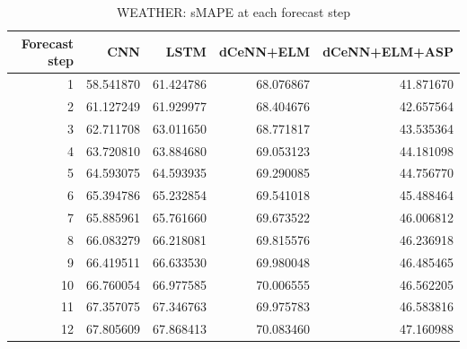 \begin{table}
\caption{WEATHER: sMAPE at each forecast step}
\begin{tabular}{rrrrr}
\toprule
Forecast step & CNN & LSTM & dCeNN+ELM & dCeNN+ELM+ASP \\
\midrule
1 & 58.541870 & 61.424786 & 68.076867 & 41.871670 \\
2 & 61.127249 & 61.929977 & 68.404676 & 42.657564 \\
3 & 62.711708 & 63.011650 & 68.771817 & 43.535364 \\
4 & 63.720810 & 63.884680 & 69.053123 & 44.181098 \\
5 & 64.593075 & 64.593935 & 69.290085 & 44.756770 \\
6 & 65.394786 & 65.232854 & 69.541018 & 45.488464 \\
7 & 65.885961 & 65.761660 & 69.673522 & 46.006812 \\
8 & 66.083279 & 66.218081 & 69.815576 & 46.236918 \\
9 & 66.419511 & 66.633530 & 69.980048 & 46.485465 \\
10 & 66.760054 & 66.977585 & 70.006555 & 46.562205 \\
11 & 67.357075 & 67.346763 & 69.975783 & 46.583816 \\
12 & 67.805609 & 67.868413 & 70.083460 & 47.160988 \\
\bottomrule
\end{tabular}
\end{table}
